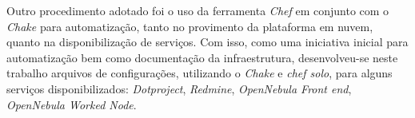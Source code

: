 Outro procedimento adotado foi o uso da ferramenta \textit{Chef} em conjunto com o \textit{Chake} para automatização, tanto no provimento da plataforma em nuvem, quanto na disponibilização de serviços. Com isso, como uma iniciativa inicial para automatização bem como documentação da infraestrutura, desenvolveu-se neste trabalho arquivos de configurações, utilizando o \textit{Chake} e \textit{chef solo}, para alguns serviços disponibilizados: \textit{Dotproject}, \textit{Redmine}, \textit{OpenNebula Front end}, \textit{OpenNebula Worked Node}.












